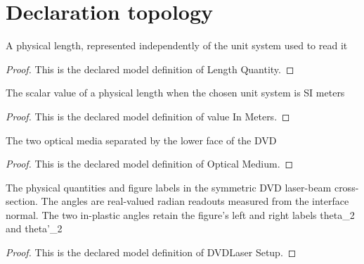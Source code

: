 \section{Declaration topology}
\begin{definition}
  \label{def:physics:phyx-mini-0013:phyxminiproblems-problemphyxmini0013-lengthquantity}
  A physical length, represented independently of the unit system used to read it
\end{definition}
\begin{proof}
  This is the declared model definition of Length Quantity.
\end{proof}
\begin{definition}
  \label{def:physics:phyx-mini-0013:phyxminiproblems-problemphyxmini0013-valueinmeters}
  The scalar value of a physical length when the chosen unit system is SI meters
\end{definition}
\begin{proof}
  This is the declared model definition of value In Meters.
\end{proof}
\begin{definition}
  \label{def:physics:phyx-mini-0013:phyxminiproblems-problemphyxmini0013-opticalmedium}
  The two optical media separated by the lower face of the DVD
\end{definition}
\begin{proof}
  This is the declared model definition of Optical Medium.
\end{proof}
\begin{definition}
  \label{def:physics:phyx-mini-0013:phyxminiproblems-problemphyxmini0013-dvdlasersetup}
  The physical quantities and figure labels in the symmetric DVD laser-beam cross-section. The angles are real-valued radian readouts measured from the interface normal. The two in-plastic angles retain the figure's left and right labels theta\_2 and theta'\_2
\end{definition}
\begin{proof}
  This is the declared model definition of DVDLaser Setup.
\end{proof}
